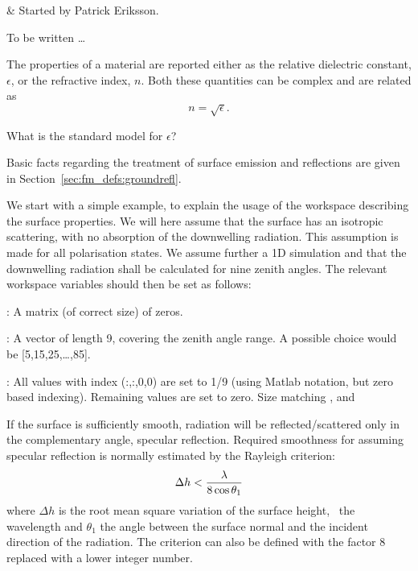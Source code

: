  \label{sec:rte}


 & Started by Patrick Eriksson. \\
\stophistory


To be written \dots


 \label{sec:rte:surfprop}

 The properties of a material are reported either as the relative
 dielectric constant, $\epsilon$, or the refractive index, $n$. Both
 these quantities can be complex and are related as
 \begin{equation}
   \label{eq:rte_eps2n}
   n = \sqrt{\epsilon}.
 \end{equation}
 
 
 \label{sec:rte:surfprop:water}

 What is the standard model for $\epsilon$?

 

 \label{sec:rte:surface}
 
 Basic facts regarding the treatment of surface emission and reflections
 are given in Section~\ref{sec:fm_defs:groundrefl}.
 
 We start with a simple example, to explain the usage of the
 workspace describing the surface properties. We will here assume that
 the surface has an isotropic scattering, with no absorption of the
 downwelling radiation. This assumption is made for all polarisation
 states. We assume further a 1D simulation and that the downwelling
 radiation shall be calculated for nine zenith angles. The relevant
 workspace variables should then be set as follows:
  
 : A matrix (of correct size) of zeros.

 : A vector of length 9, covering the zenith
 angle range. A possible choice would be [5,15,25,\dots,85].
 
 : All values with index (:,:,0,0) are
 set to 1/9 (using Matlab notation, but zero based indexing).
 Remaining values are set to zero.  Size matching
 ,  and


 \label{sec:rte:surface:specular}
 
 If the surface is sufficiently smooth, radiation will be
 reflected/scattered only in the complementary angle, specular
 reflection. Required smoothness for assuming specular reflection is
 normally estimated by the Rayleigh criterion:
 \begin{equation}
   \label{eq:rte:rayleigh}
   \Delta h < \frac{\lambda}{8\cos\theta_1}
 \end{equation}
 where $\Delta h$ is the root mean square variation of the surface
 height, \Wvl\ the wavelength and $\theta_1$ the angle between the
 surface normal and the incident direction of the radiation. The
 criterion can also be defined with the factor 8 replaced with a lower
 integer number.
 

